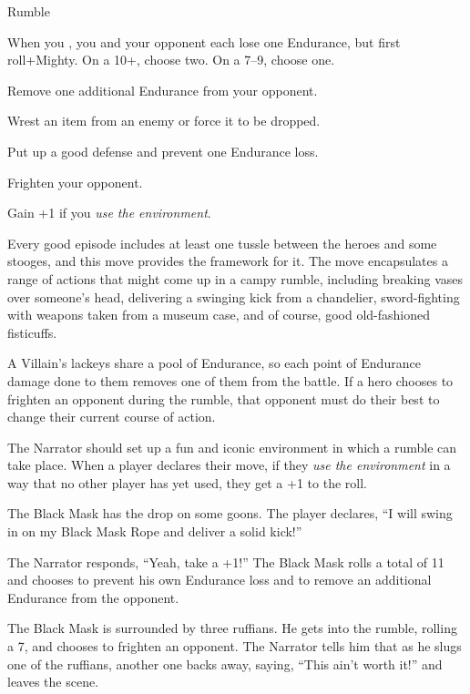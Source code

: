 \begin{movedef}{Rumble}
{
  When you , you and your opponent each lose one Endurance,
  but first roll+Mighty. On a 10+, choose two. On a 7--9, choose one.
  \begin{choices}
    \item Remove one additional Endurance from your opponent.
    \item Wrest an item from an enemy or force it to be dropped.
    \item Put up a good defense and prevent one Endurance loss.
    \item Frighten your opponent.
    \end{choices}
  Gain +1 if you \emph{use the environment}.  
  \onamiss{}
}
{
  Every good episode includes at least one tussle between the heroes
  and some stooges, and this move provides the framework for it.
  The move encapsulates a range of actions that might come up
  in a campy rumble, including breaking vases over someone's head,
  delivering a swinging kick from a chandelier,
  sword-fighting with weapons taken from a museum case,
  and of course, good old-fashioned fisticuffs.

  A Villain's lackeys share a pool of Endurance, so each point
  of Endurance damage done to them removes one of them from
  the battle.
  If a hero chooses to frighten an opponent during the rumble,
  that opponent must do their best to change their current course
  of action.
  
  The Narrator should set up a fun and iconic environment in which a rumble
  can take place. When a player declares their move, if they
  \emph{use the environment} in a way
  that no other player has yet used, they get a +1 to the roll.

  \begin{example}
    The Black Mask has the drop on some goons. The player declares, ``I will swing in on my Black Mask Rope and deliver a solid kick!''

    The Narrator responds, ``Yeah, take a +1!'' The Black Mask rolls
    a total of 11 and chooses to prevent his own Endurance loss
    and to remove an additional Endurance from the opponent.
  \end{example}


  \begin{example}
    The Black Mask is surrounded by three ruffians. He gets into the
    rumble, rolling a 7, and chooses to frighten an opponent.
    The Narrator tells him that as he slugs one of the ruffians,
    another one backs away, saying, ``This ain't worth it!'' and
    leaves the scene.
  \end{example}
}
\end{movedef}

